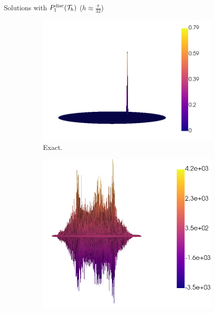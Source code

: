 			\begin{frame}{Solutions with $\relax{P}^{\text{disc}}_1(\mathcal{T}_h)$ ($h\approx\frac{\pi}{32}$)}
				\vspace*{-0.5cm}
				\begin{figure}[h!]
					\begin{subfigure}[b]{0.49\textwidth}
						\centering
						\includegraphics[scale=0.16]{img/Conveccion_Reaccion/strong/conv_react_u_ex_nx-64.png}
						\caption{Exact.}
					\end{subfigure}
					\begin{subfigure}[b]{0.49\textwidth}
						\centering
						\includegraphics[scale=0.16]{img/Conveccion_Reaccion/strong/conv_react_u_FE_nx-64.png}

\end{subfigure}
\end{figure}
\end{frame}
